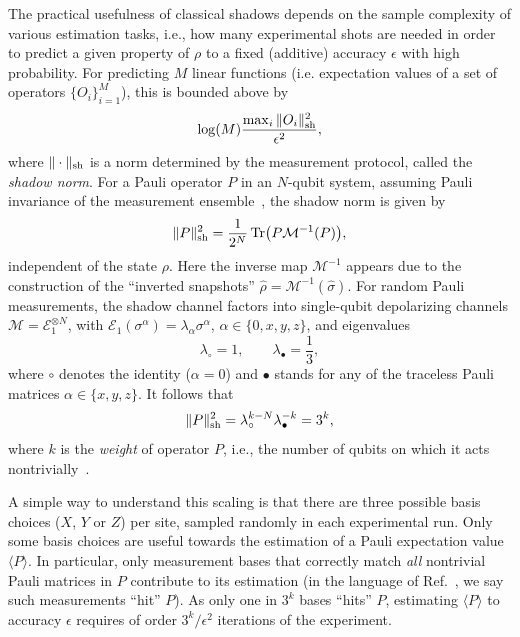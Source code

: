 \documentclass[a4paper,twocolumns,11pt,accepted=2024-03-04]{quantumarticle}
\newcommand{\shadownorm}[1]{\ensuremath{\| #1 \|_{\rm sh}}}
\begin{document}
The practical usefulness of classical shadows depends on the {sample complexity} of various estimation tasks, i.e., how many experimental shots are needed in order to predict a given property of $\rho$ to a fixed (additive) accuracy $\epsilon$ with high probability.
For predicting $M$ linear functions (i.e. expectation values of a set of operators $\{O_i\}_{i=1}^M$), this is bounded above by~\cite{huang_predicting_2020}
\begin{equation}
\log(M) \frac{\max_i\shadownorm{O_i}^2}{\epsilon^2},
\label{eq:hkp_bound}
\end{equation}
where $\shadownorm{\cdot}$ is a norm determined by the measurement protocol, called the {\it shadow norm}.
For a Pauli operator $P$ in an $N$-qubit system, assuming Pauli invariance of the measurement ensemble~\cite{bu_classical_2022}, the shadow norm is given by 
\begin{equation}
    \shadownorm{P}^2 = \frac{1}{2^N} \Tr(P \mathcal{M}^{-1}(P)),
\end{equation}
independent of the state $\rho$. Here the inverse map $\mathcal{M}^{-1}$ appears due to the construction of the ``inverted snapshots'' $\hat{\rho} = \mathcal{M}^{-1}(\hat{\sigma})$. 
For random Pauli measurements, the shadow channel factors into single-qubit depolarizing channels $\mathcal{M} = \mathcal{E}_1^{\otimes N}$, with $\mathcal{E}_1(\sigma^\alpha) = \lambda_\alpha \sigma^\alpha$, $\alpha \in \{0,x,y,z\}$, and eigenvalues
\begin{equation}
    \lambda_{\circ} = 1,
    \qquad 
    \lambda_\bullet = \frac{1}{3}, \label{eq:evals_paulishadows}
\end{equation}
where $\circ$ denotes the identity ($\alpha = 0$) and $\bullet$ stands for any of the traceless Pauli matrices $\alpha \in \{x,y,z\}$.
It follows that 
\begin{equation}
\shadownorm{P}^2 = \lambda_\circ^{k-N} \lambda_\bullet^{-k} = 3^k,
\label{eq:randompauli_scaling}
\end{equation}
where $k$ is the {\it weight} of operator $P$, i.e., the number of qubits on which it acts nontrivially~\cite{huang_predicting_2020}. 

A simple way to understand this scaling is that there are three possible basis choices ($X$, $Y$ or $Z$) per site, sampled randomly in each experimental run. Only some basis choices are useful towards the estimation of a Pauli expectation value $\langle P \rangle$. 
In particular, only measurement bases that correctly match {\it all} nontrivial Pauli matrices in $P$ contribute to its estimation (in the language of Ref.~\cite{huang_efficient_2021}, we say such measurements ``hit'' $P$). As only one in $3^k$ bases ``hits'' $P$, estimating $\langle P \rangle$ to accuracy $\epsilon$ requires of order $3^k /\epsilon^2$ iterations of the experiment.
\end{document}
